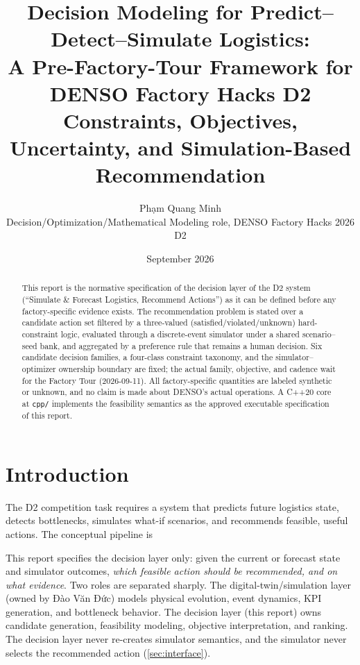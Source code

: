 \documentclass[11pt,a4paper]{article}
\title{\textbf{Decision Modeling for Predict--Detect--Simulate Logistics:\\
A Pre-Factory-Tour Framework for DENSO Factory Hacks D2}\\[6pt]
\large Constraints, Objectives, Uncertainty, and Simulation-Based Recommendation}
\author{Ph\d{a}m Quang Minh\\[2pt]
\small Decision/Optimization/Mathematical Modeling role, DENSO Factory Hacks 2026 D2}
\date{September 2026}
\begin{document}
\maketitle

\begin{abstract}
\noindent This report is the normative specification of the decision layer of
the D2 system (``Simulate \& Forecast Logistics, Recommend Actions'') as it can
be defined before any factory-specific evidence exists. The recommendation
problem is stated over a candidate action set filtered by a three-valued
(satisfied/violated/unknown) hard-constraint logic, evaluated through a
discrete-event simulator under a shared scenario--seed bank, and aggregated by
a preference rule that remains a human decision. Six candidate decision
families, a four-class constraint taxonomy, and the simulator--optimizer
ownership boundary are fixed; the actual family, objective, and cadence wait
for the Factory Tour (2026-09-11). All factory-specific quantities are labeled
synthetic or unknown, and no claim is made about DENSO's actual operations.
A C++20 core at \texttt{cpp/} implements the feasibility semantics as the
approved executable specification of this report.
\end{abstract}

\tableofcontents
\newpage

\section{Introduction}\label{sec:intro}

The D2 competition task requires a system that predicts future logistics
state, detects bottlenecks, simulates what-if scenarios, and recommends
feasible, useful actions. The conceptual pipeline is

\begin{center}
\end{center}

This report specifies the decision layer only: given the current or forecast
state and simulator outcomes, \emph{which feasible action should be
recommended, and on what evidence}. Two roles are separated sharply. The
digital-twin/simulation layer (owned by Đào Văn Đức) models physical
evolution, event dynamics, KPI generation, and bottleneck behavior. The
decision layer (this report) owns candidate generation, feasibility modeling,
objective interpretation, and ranking. The decision layer never re-creates
simulator semantics, and the simulator never selects the recommended action
(\cref{sec:interface}).
\end{document}
